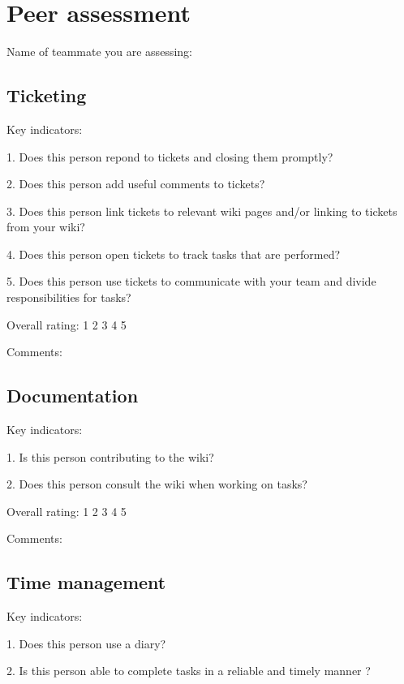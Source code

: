 \documentclass{article}   	%
\begin{document}
\newpage

\section*{Peer assessment}

Name of teammate you are assessing: 
\vskip 1cm

\subsection*{Ticketing}

Key indicators: 

1.  Does this person repond to tickets and closing them promptly?

2.  Does this person add useful comments to tickets?

3.  Does this person link tickets to relevant wiki pages and/or linking to tickets from your wiki?

4.  Does this person open tickets to track tasks that are performed?

5.  Does this person use tickets to communicate with your team and divide responsibilities for tasks?

Overall rating: \hskip 1cm 1 \hskip 1cm 2 \hskip 1cm 3 \hskip 1cm 4 \hskip 1cm 5 

Comments:

\vskip 5cm



\subsection*{Documentation}

Key indicators: 

1.  Is this person contributing to the wiki?

2.  Does this person consult the wiki when working on tasks?

Overall rating: \hskip 1cm 1 \hskip 1cm 2 \hskip 1cm 3 \hskip 1cm 4 \hskip 1cm 5 

Comments:

\newpage

\subsection*{Time management}

Key indicators: 

1.  Does this person  use a diary?

2.  Is this person able to complete tasks in a reliable and timely manner ?
\end{document}
